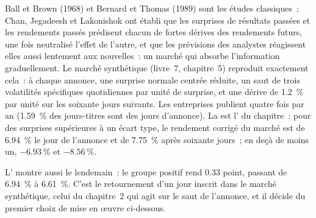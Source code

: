 Ball et Brown (1968) et Bernard et Thomas (1989) sont les études classiques~; Chan, Jegadeesh et Lakonishok ont établi que les surprises de résultats passées et les rendements passés
prédisent chacun de fortes dérives des rendements futurs, une fois neutralisé l'effet de l'autre, et que les prévisions des analystes réagissent elles aussi lentement aux nouvelles~: un marché
qui absorbe l'information graduellement. Le marché synthétique (livre~7, chapitre~5) reproduit exactement cela~: à chaque annonce, une surprise normale centrée réduite, un saut de
trois volatilités spécifiques quotidiennes par unité de surprise, et une dérive de 1.2~\% par unité sur les soixante jours suivants. Les entreprises publient quatre fois par an (1.59~\% des
jours-titres sont des jours d'annonce). La  est l' du chapitre~: pour des surprises supérieures à un écart type, le
rendement corrigé du marché est de 6.94~\% le jour de l'annonce et de 7.75~\% après soixante jours~; en deçà de moins un, $-6.93~\%$ et $-8.56~\%$.

\begin{omfigure}

\label{fig:s1:earnings:car}
\end{omfigure}

L' montre aussi le lendemain~: le groupe positif rend 0.33 point, passant de 6.94~\% à 6.61~\%. C'est le retournement d'un jour inscrit dans le marché synthétique, celui
du chapitre~2 qui agit sur le saut de l'annonce, et il décide du premier choix de mise en œuvre ci-dessous.

